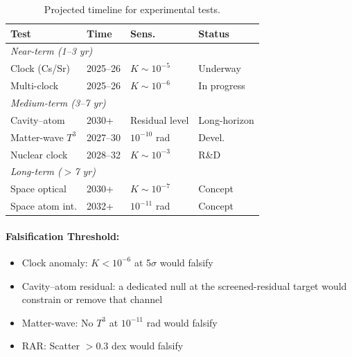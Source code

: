 \begin{table}[h!]
\centering
\caption{Projected timeline for \DFD experimental tests.}
\label{tab:timeline}
\begin{ruledtabular}
\scriptsize
\begin{tabular}{llll}
\textbf{Test} & \textbf{Time} & \textbf{Sens.} & \textbf{Status} \\
\hline
\multicolumn{4}{l}{\textit{Near-term (1--3 yr)}} \\
Clock (Cs/Sr) & 2025--26 & $K\sim 10^{-5}$ & Underway \\
Multi-clock & 2025--26 & $K\sim 10^{-6}$ & In progress \\
\hline
\multicolumn{4}{l}{\textit{Medium-term (3--7 yr)}} \\
Cavity--atom & 2030+ & Residual level & Long-horizon \\
Matter-wave $T^3$ & 2027--30 & $10^{-10}$ rad & Devel. \\
Nuclear clock & 2028--32 & $K\sim 10^{-3}$ & R\&D \\
\hline
\multicolumn{4}{l}{\textit{Long-term ($>$7 yr)}} \\
Space optical & 2030+ & $K\sim 10^{-7}$ & Concept \\
Space atom int. & 2032+ & $10^{-11}$ rad & Concept \\
\end{tabular}
\end{ruledtabular}
\end{table}

\paragraph{Falsification Threshold:}
\begin{itemize}
\item Clock anomaly: $K < 10^{-6}$ at 5$\sigma$ would falsify
\item Cavity--atom residual: a dedicated null at the screened-residual target would constrain or remove that channel
\item Matter-wave: No $T^3$ at $10^{-11}$ rad would falsify
\item RAR: Scatter $> 0.3$ dex would falsify
\end{itemize}
